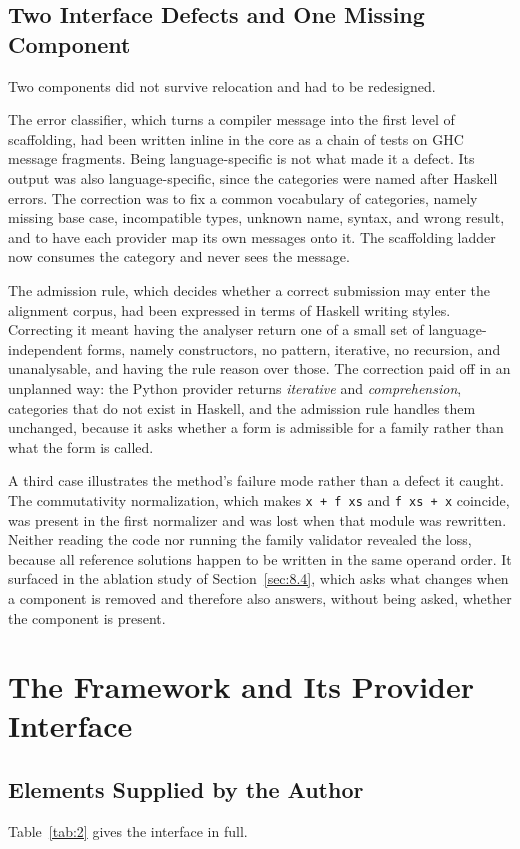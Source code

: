 \documentclass[journal]{IEEEtran}
\begin{document}
\subsection{Two Interface Defects and One Missing Component}\label{sec:3.4}
Two components did not survive relocation and had to be redesigned.

The error classifier, which turns a compiler message into the first
level of scaffolding, had been written inline in the core as a chain of
tests on GHC message fragments. Being language-specific is not what made
it a defect. Its output was also language-specific, since the categories
were named after Haskell errors. The correction was to fix a common
vocabulary of categories, namely missing base case, incompatible types,
unknown name, syntax, and wrong result, and to have each provider map
its own messages onto it. The scaffolding ladder now consumes the
category and never sees the message.

The admission rule, which decides whether a correct submission may enter
the alignment corpus, had been expressed in terms of Haskell writing
styles. Correcting it meant having the analyser return one of a small
set of language-independent forms, namely constructors, no pattern,
iterative, no recursion, and unanalysable, and having the rule reason
over those. The correction paid off in an unplanned way: the Python
provider returns \emph{iterative} and \emph{comprehension}, categories
that do not exist in Haskell, and the admission rule handles them
unchanged, because it asks whether a form is admissible for a family
rather than what the form is called.

A third case illustrates the method's failure mode rather than a defect
it caught. The commutativity normalization, which makes
\texttt{x + f xs} and \texttt{f xs + x} coincide, was present in
the first normalizer and was lost when that module was rewritten.
Neither reading the code nor running the family validator revealed the
loss, because all reference solutions happen to be written in the same
operand order. It surfaced in the ablation study of Section~\ref{sec:8.4}, which
asks what changes when a component is removed and therefore also
answers, without being asked, whether the component is present.

\section{The Framework and Its Provider Interface}\label{sec:4}
\subsection{Elements Supplied by the Author}\label{sec:4.1}
Table~\ref{tab:2} gives the interface in full.
\end{document}

